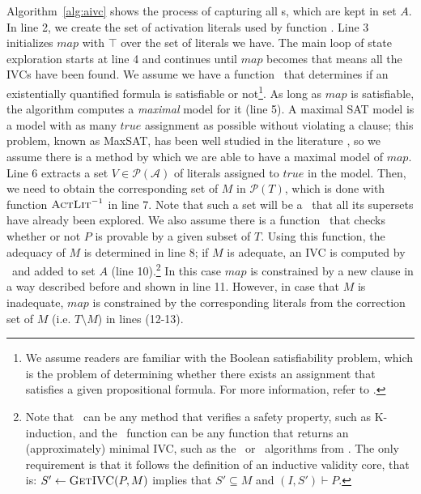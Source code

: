 Algorithm~\ref{alg:aivc} shows the process of capturing all \ivc s, which are kept in set $A$.
In line 2, we create the set of activation literals used by function \actlit . Line 3 initializes $map$ with $\top$ over the set of literals we have. The main loop of state exploration starts at line 4 and continues until $map$ becomes \unsat that means all the IVCs have been found. We assume we have a function \checksat ~that determines if an existentially quantified formula  is satisfiable or not\footnote{We assume readers are familiar with the Boolean satisfiability problem, which is the problem of determining whether there exists an assignment that satisfies a given propositional formula. For more information, refer to \cite{cook1971complexity}.}.
As long as $map$ is satisfiable, the algorithm computes a \emph{maximal} \sat model for it (line 5). A maximal SAT model is a model with as many $true$ assignment as possible without violating a clause; this problem, known as MaxSAT, has been well studied in the literature \cite{cimatti2013modular, davies2011solving, morgado2013iterative}, so we assume there is a method by which we are able to have a maximal model of $map$.
Line 6 extracts a set $V \in \mathcal{P} (\mathcal{A})$ of literals assigned to $true$ in the model.
Then, we need to obtain the corresponding set of $M$ in $\mathcal{P}(T)$, which is done with function $\textsc{ActLit} ^{-1}$ in line 7. Note that such a set will be a \mis\ that all its supersets have already been explored. We also assume there is a function \isadeq ~that checks whether or not $P$ is provable by a given subset of $T$. Using this function, the adequacy of $M$ is determined in line 8; if $M$ is adequate, an IVC  is computed by \getivc ~and added to set $A$ (line 10).\footnote{Note that \isadeq ~can be any method that verifies a safety property, such as K-induction, and the \getivc\ function can be any function that returns an (approximately) minimal IVC, such as the \ucalg\ or \ucbfalg\ algorithms from \cite{Ghass16}.  The only requirement is that it follows the definition of an inductive validity core, that is: $S' \leftarrow \textsc{GetIVC} (P, M)$ implies that $S' \subseteq M$ and $(I, S') \vdash P$.} In this case $map$ is constrained by a new clause in a way described before and shown in line 11. However, in case that $M$ is inadequate, $map$ is constrained by the corresponding literals from the correction set of $M$ (i.e. $T \setminus M$) in lines (12-13).

